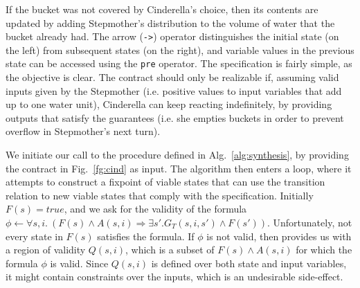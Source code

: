 If the bucket was not covered by Cinderella's choice, then its contents are
updated by adding Stepmother's distribution to the volume of water that the
bucket already had. The arrow (\texttt{->}) operator distinguishes the initial state (on the left) from subsequent states (on the right), and variable values in the previous state can be accessed using the \texttt{pre} operator.
The specification is fairly simple, as the objective is clear. The contract
should only be realizable if, assuming valid inputs given by the Stepmother
(i.e. positive values to input variables that add up to one water unit),
Cinderella can keep reacting indefinitely, by providing outputs that satisfy the
guarantees (i.e. she empties buckets in order to prevent overflow in Stepmother's next turn).
\iffalse
\begin{figure}[!t]
\centering
 \begin{Verbatim}[fontsize=\scriptsize]
...
(and ...
 (or (not (<= (+ b2 i2) 2.0)) (<= (+ b2 i2) 2.0) (and (<= (+ b2 i2) 2.0)
     (not (<= (+ b2 i2) 2.0))
     (or (and (not (>= (+ b1 i1) 2.0))
   	          (<= (- 5.0) (+ (* (- 1.0) i5) (* (- 1.0) b2) (* (- 1.0) i2))))
         (and (not (<= (+ b2 i2) 0.0)) (not (>= (+ b3 i3) 2.0))  (not (>= i4 2.0))
              (<= (- 5.0) (+ (* (- 1.0) i5) (* (- 1.0) b2) (* (- 1.0) i2)))))))
 (or (and %init (= i4 0.0)) (not %init))
 (or (and %init (= i5 0.0)) (not %init))
 (<= (+ b3 i3) 2.0)
 (<= i4 2.0)
 (<= i5 2.0)
 ...)
...
 \end{Verbatim}
\caption{Code snippet of the region of validity generated for the Cinderella-Stepmother
example}
\label{fg:snippet}
\end{figure}
\fi
We initiate our call to the procedure defined in Alg.~\ref{alg:synthesis},
by providing the contract in Fig.~\ref{fg:cind} as input. The algorithm
then enters a loop, where it attempts to construct a fixpoint of
viable states that can use the transition relation to new viable states that comply with the specification. Initially $F(s) = true$, and we ask \aeval for the validity of the formula $\phi \gets \forall s,i. \ (F(s) \land A(s,i) \Rightarrow \exists s'.G_{T}(s,i,s') \land F(s'))$. Unfortunately, not every state in $F(s)$
satisfies the formula. If $\phi$ is not valid, then \aeval provides us with
a region of validity $Q(s,i)$, which is a subset of $F(s) \land A(s,i)$ for
which the formula $\phi$ is valid. Since $Q(s,i)$ is defined over both state and
input variables, it might contain constraints over the inputs, which is an
undesirable side-effect.
